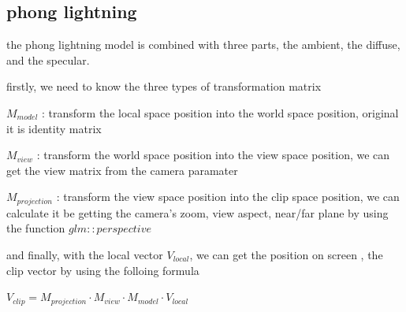 \documentclass[acmtog]{acmart}
\begin{document}
\subsection{phong lightning}
the phong lightning model is combined with three parts,
the ambient, the diffuse, and the specular.

firstly, we need to know the three types of transformation matrix

\(M_{model}\) : transform the local space position into the world space position, original it is identity matrix

\(M_{view}\) : transform the world space position into the view space position, 
we can get the view matrix from the camera paramater

\(M_{projection}\) : transform the view space position into the clip space position, we can calculate it be 
getting the camera's zoom, view aspect, near/far plane by using the function \(glm::perspective\)

and finally, with the local vector \(V_{local}\), we can get the position on screen , the clip vector by using the folloing formula

\(V_{clip} = M_{projection} ⋅ M_{view} ⋅ M_{model} ⋅ V_{local}\)
\end{document}
